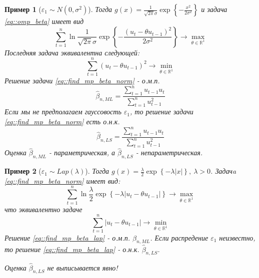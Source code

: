 \documentclass[12pt]{article}
\newtheorem*{example}{Пример}
\def\eps{ \varepsilon }
\def\R{ \mathbb{R} }
\begin{document}
\begin{example}[$\eps_1\sim N(0,\sigma^2)$]
    Тогда $g(x)=\frac{1}{\sqrt{2\pi}\sigma}\exp{\left\{-\frac{x^2}{2\sigma^2}\right\}}$
    и задача \eqref{eq::omp_beta} имеет вид
    \[\sum_{t=1}^n\ln\frac{1}{\sqrt{2\pi}\sigma}\exp{\left\{-\frac{(u_t-\theta u_{t-1})^2}{2\sigma^2}\right\}}\rightarrow\max_{\theta\in\R^1}\]
    Последняя задача эквивалентна следующей:
    \begin{equation}\label{eq::find_mp_beta_norm}
        \sum_{t=1}^n(u_t-\theta u_{t-1})^2\rightarrow\min_{\theta\in\R^1}
    \end{equation}
    Решение задачи \eqref{eq::find_mp_beta_norm} - о.м.п.
    \begin{equation}
        \widehat{\beta}_{n, ML}=\frac{\sum_{t=1}^nu_{t-1}u_t}{\sum_{t=1}^nu_{t-1}^2}
    \end{equation}
    Если мы не предполагаем гауссовость $\eps_1$, то решение задачи \eqref{eq::find_mp_beta_norm} есть о.н.к.
    \begin{equation}
        \widehat{\beta}_{n,LS}=\frac{\sum_{t=1}^nu_{t-1}u_t}{\sum_{t=1}^nu^2_{t-1}}
    \end{equation}
    Оценка $\widehat{\beta}_{n, ML}$ - параметрическая, а $\widehat{\beta}_{n, LS}$ - непараметрическая.
\end{example}
\begin{example}[$\eps_1\sim Lap(\lambda)$]
    Тогда $g(x)=\frac{\lambda}{2}\exp{\left\{-\lambda\left\lvert x\right\rvert \right\}},\ \lambda>0$. Задачa \eqref{eq::find_mp_beta_norm} имеет вид:
    \[\sum_{t=1}^n\ln\frac{\lambda}{2}\exp{\left\{-\lambda\left\lvert u_t-\theta u_{t-1}\right\rvert \right\}}\rightarrow\max_{\theta\in\R^1}\]
    что эквивалентно задаче
    \begin{equation}\label{eq::find_mp_beta_lap}
        \sum_{t=1}^n\left\lvert u_t-\theta u_{t-1}\right\rvert \rightarrow\min_{\theta\in\R^1}
    \end{equation}
    Решение \eqref{eq::find_mp_beta_lap} - о.м.п. $\widehat{\beta}_{n,ML}$.
    Если распредение $\eps_1$ неизвестно, то решение \eqref{eq::find_mp_beta_lap} - о.н.к. $\widehat{\beta}_{n,LS}$.

    Оценка $\widehat{\beta}_{n,LS}$ не выписывается явно!
\end{example}
\end{document}
